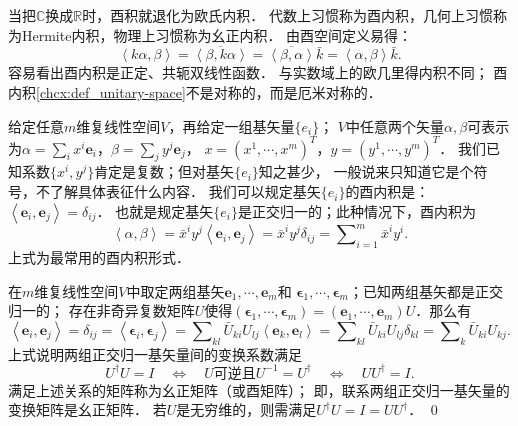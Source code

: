  
 


当把$\mathbb{C}$换成$\mathbb{R}$时，酉积就退化为欧氏内积．
代数上习惯称为酉内积，几何上习惯称为Hermite内积，物理上习惯称为幺正内积．
由酉空间定义易得：
\begin{equation}
	\left<k\alpha,\beta\right>=\overline{\left<\beta,k\alpha\right>}
	=\overline{\left<\beta,\alpha\right>} \bar{k} = \left<\alpha,\beta\right>\bar{k}.
\end{equation}
容易看出酉内积是正定、共轭双线性函数．
与实数域上的欧几里得内积不同；
酉内积\ref{chcx:def_unitary-space}不是对称的，而是厄米对称的．

给定任意$m$维复线性空间$V$，再给定一组基矢量$\{{e}_i\}$；
$V$中任意两个矢量$\alpha,\beta$可表示
为$\alpha=\sum_i x^i \boldsymbol{e}_i$，$\beta=\sum_j y^j \boldsymbol{e}_j$，
$x=(x^1,\cdots,x^m)^T$，$y=(y^1,\cdots,y^m)^T$．
我们已知系数$\{x^i,y^j\}$肯定是复数；但对基矢$\{{e}_i\}$知之甚少，
一般说来只知道它是个符号，不了解具体表征什么内容．
我们可以规定基矢$\{{e}_i\}$的酉内积是：
$    \left<\boldsymbol{e}_i,\boldsymbol{e}_j\right> = \delta_{ij}$．
也就是规定基矢$\{{e}_i\}$是正交归一的；此种情况下，酉内积为
\begin{equation}\label{chcx:eqn_Hermite-Product}
    \left<\alpha,\beta\right>=\bar{x}^i y^j \left<\boldsymbol{e}_i,\boldsymbol{e}_j\right>
     =\bar{x}^i y^j \delta_{ij} = \sum\nolimits_{i=1}^{m}\bar{x}^i y^i.
\end{equation}
上式为最常用的酉内积形式．

\begin{example}
    在$m$维复线性空间$V$中取定两组基矢$\boldsymbol{e}_1,\cdots,\boldsymbol{e}_m$和
   $\boldsymbol{\epsilon}_1,\cdots,\boldsymbol{\epsilon}_m$；已知两组基矢都是正交归一的；
   存在非奇异复数矩阵$U$使得$(\boldsymbol{\epsilon}_1,\cdots,\boldsymbol{\epsilon}_m)
   =(\boldsymbol{e}_1,\cdots,\boldsymbol{e}_m)U$．那么有
   \begin{equation*}
       \left<\boldsymbol{e}_i,\boldsymbol{e}_j\right> = \delta_{ij} 
       =\left<\boldsymbol{\epsilon}_i,\boldsymbol{\epsilon}_j\right> 
       =\sum\nolimits_{kl}\bar{U}_{ki} U_{lj}\left<\boldsymbol{e}_k,\boldsymbol{e}_l\right>
       =\sum\nolimits_{kl}\bar{U}_{ki} U_{lj}\delta_{kl}
       =\sum\nolimits_{k}\bar{U}_{ki} U_{kj} .
   \end{equation*}
   上式说明两组正交归一基矢量间的变换系数满足
   \begin{equation}
       U^\dagger U = I \quad \Leftrightarrow\quad
       U \text {可逆且} U^{-1} = U^\dagger \quad \Leftrightarrow\quad
       U U^\dagger = I .
   \end{equation}
   满足上述关系的矩阵称为{\heiti 幺正矩阵}（或酉矩阵）；
   即，联系两组正交归一基矢量的变换矩阵是幺正矩阵．
   若$U$是无穷维的，则需满足$U^\dagger U = I=U U^\dagger$．   \qed
\end{example}


